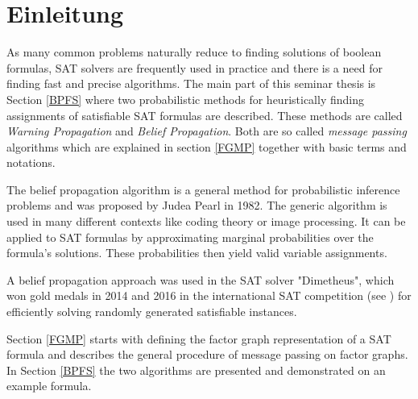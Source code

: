 \chapter{Einleitung}

As many common problems naturally reduce to finding solutions of boolean formulas, SAT solvers are frequently used in practice and there is a need for finding fast and precise algorithms.  
The main part of this seminar thesis is Section \ref{BPFS} where two probabilistic methods for heuristically finding assignments of satisfiable SAT formulas are described. These methods are called \emph{Warning Propagation} and \emph{Belief Propagation}. Both are so called \emph{message passing} algorithms which are explained in section \ref{FGMP} together with basic terms and notations.

The belief propagation algorithm is a general method for probabilistic inference problems and was proposed by Judea Pearl in 1982. The generic algorithm is used in many different contexts like coding theory or image processing. It can be applied to SAT formulas by approximating marginal probabilities over the formula's solutions. These probabilities then yield valid variable assignments.

A belief propagation approach was used in the SAT solver "Dimetheus", which won gold medals in 2014 and 2016 in the international SAT competition (see \cite{satcomp}) for efficiently solving randomly generated satisfiable instances.

Section \ref{FGMP} starts with defining the factor graph representation of a SAT formula and describes the general procedure of message passing on factor graphs. \newline
In Section \ref{BPFS} the two algorithms are presented and demonstrated on an example formula.